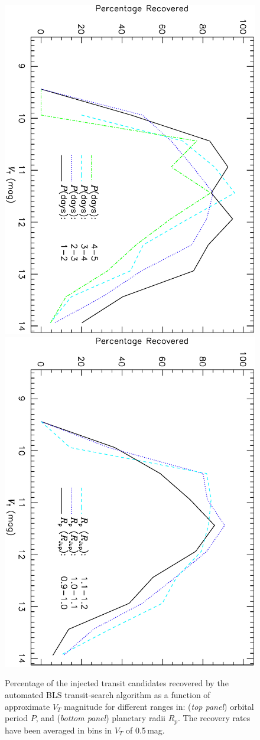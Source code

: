 \begin{figure}
\begin{center}
\centering
\includegraphics[width=.55\textwidth, angle=90]{7_comp_d}\\
\includegraphics[width=.55\textwidth, angle=90]{7_comp_e}\\
\caption[BLS recovery rates for different orbital periods and planetary radii]{%
Percentage of the injected transit candidates recovered by the automated BLS transit-search algorithm as a function of approximate $V_{T}$ magnitude for different ranges in: %
({\it top panel}) orbital period $P$, and %
({\it bottom panel}) planetary radii $R_{p}$. %
The recovery rates have been averaged in bins in $V_{T}$ of 0.5\,mag.%
}
\label{cha:human:sec:model:fig:recrates1}
\end{center}
\end{figure}

